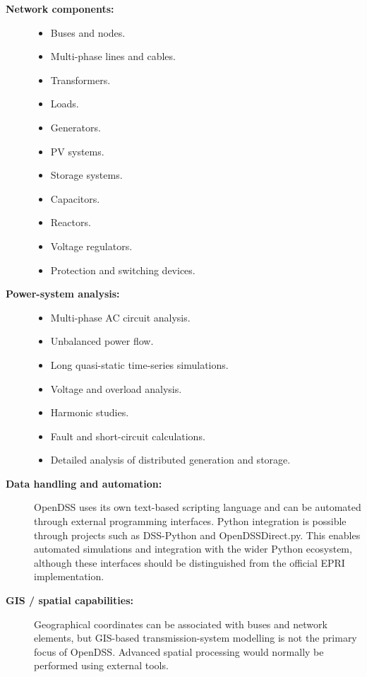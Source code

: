 \begin{description}
    \item[\textbf{Network components:}] \hfill
    \begin{itemize}
        \item Buses and nodes.
        \item Multi-phase lines and cables.
        \item Transformers.
        \item Loads.
        \item Generators.
        \item PV systems.
        \item Storage systems.
        \item Capacitors.
        \item Reactors.
        \item Voltage regulators.
        \item Protection and switching devices.
    \end{itemize}

    \item[\textbf{Power-system analysis:}] \hfill
    \begin{itemize}
        \item Multi-phase AC circuit analysis.
        \item Unbalanced power flow.
        \item Long quasi-static time-series simulations.
        \item Voltage and overload analysis.
        \item Harmonic studies.
        \item Fault and short-circuit calculations.
        \item Detailed analysis of distributed generation and storage.
    \end{itemize}

    \item[\textbf{Data handling and automation:}]
    OpenDSS uses its own text-based scripting language and can be automated
    through external programming interfaces. Python integration is possible
    through projects such as DSS-Python and OpenDSSDirect.py. This enables
    automated simulations and integration with the wider Python ecosystem,
    although these interfaces should be distinguished from the official
    EPRI implementation.

    \item[\textbf{GIS / spatial capabilities:}]
    Geographical coordinates can be associated with buses and network
    elements, but GIS-based transmission-system modelling is not the primary
    focus of OpenDSS. Advanced spatial processing would normally be performed
    using external tools.


\end{description}
